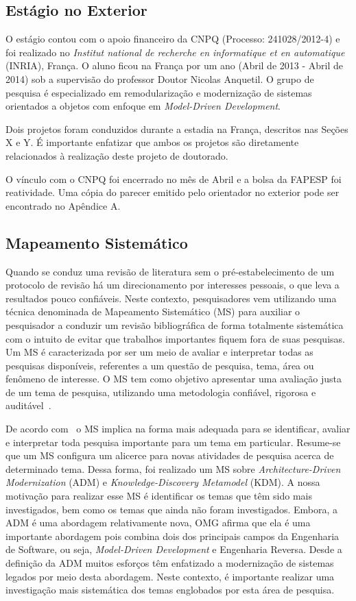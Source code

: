 \subsection{Estágio no Exterior}

O estágio contou com o apoio financeiro da CNPQ (Processo: 241028/2012-4) e foi realizado no \textit{Institut national de recherche en informatique et en automatique} (INRIA), França. O aluno ficou na França por um ano (Abril de 2013 - Abril de 2014) sob a supervisão do professor Doutor Nicolas Anquetil. O grupo de pesquisa é especializado em remodularização e modernização de sistemas orientados a objetos com enfoque em \textit{Model-Driven Development}. 

Dois projetos foram conduzidos durante a estadia na França, descritos nas Seções X e Y. É importante enfatizar que ambos os projetos são diretamente relacionados à realização deste projeto de doutorado.

O vínculo com o CNPQ foi encerrado no mês de Abril e a bolsa da FAPESP foi reatividade. Uma cópia do parecer emitido pelo orientador no exterior pode ser encontrado no Apêndice A.

\subsection{Mapeamento Sistemático}

Quando se conduz uma revisão de literatura sem o pré-estabelecimento de um protocolo de revisão há um direcionamento por interesses pessoais, o que leva a resultados pouco confiáveis. Neste contexto, pesquisadores vem utilizando uma técnica denominada de Mapeamento Sistemático (MS) para auxiliar o pesquisador a conduzir um revisão bibliográfica de forma totalmente sistemática com o intuito de evitar que trabalhos importantes fiquem fora de suas pesquisas. Um MS é caracterizada por ser um meio de avaliar e interpretar todas as pesquisas disponíveis, referentes a um questão de pesquisa, tema, área ou fenômeno de interesse. O MS tem como objetivo apresentar uma avaliação justa de um tema de pesquisa, utilizando uma metodologia confiável, rigorosa e auditável~\cite{kit04}.

De acordo com~\citet{kit04} o MS implica na forma mais adequada para se identificar, avaliar e interpretar toda pesquisa importante para um tema em particular. Resume-se que um MS configura um alicerce para novas atividades de pesquisa acerca de determinado tema. Dessa forma, foi realizado um MS sobre \textit{Architecture-Driven Modernization} (ADM) e \textit{Knowledge-Discovery Metamodel} (KDM). A nossa motivação para realizar esse MS é identificar os temas que têm sido mais investigados, bem como os temas que ainda não foram investigados. Embora, a ADM é uma abordagem relativamente nova, OMG afirma que ela é uma importante abordagem pois combina dois dos principais campos da Engenharia de Software, ou seja, \textit{Model-Driven Development} e Engenharia Reversa. Desde a definição da ADM muitos esforços têm enfatizado a modernização de sistemas legados por meio desta abordagem. Neste contexto, é importante realizar uma investigação mais sistemática dos temas englobados por esta área de pesquisa. 

